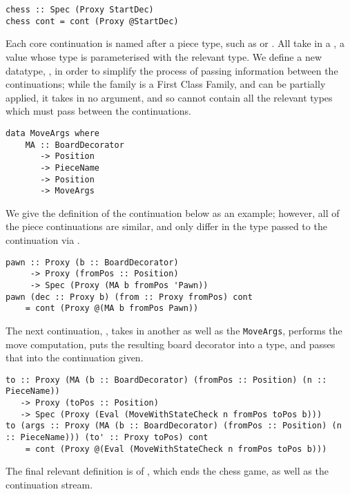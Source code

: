 \begin{lstlisting}
chess :: Spec (Proxy StartDec)
chess cont = cont (Proxy @StartDec)
\end{lstlisting}

Each core continuation is named after a piece type, such as  or . All take in a , a  value whose type is parameterised with the relevant  type. We define a new datatype, , in order to simplify the process of passing information between the continuations; while the  family is a First Class Family, and can be partially applied, it takes in no  argument, and so cannot contain all the relevant types which must pass between the continuations.

\begin{lstlisting}
data MoveArgs where
    MA :: BoardDecorator
       -> Position
       -> PieceName
       -> Position
       -> MoveArgs
\end{lstlisting}

We give the definition of the  continuation below as an example; however, all of the piece continuations are similar, and only differ in the  type passed to the continuation via .

\begin{lstlisting}
pawn :: Proxy (b :: BoardDecorator)
     -> Proxy (fromPos :: Position)
     -> Spec (Proxy (MA b fromPos 'Pawn))
pawn (dec :: Proxy b) (from :: Proxy fromPos) cont
    = cont (Proxy @(MA b fromPos Pawn))
\end{lstlisting}

The next continuation, , takes in another  as well as the \lstinline{MoveArgs}, performs the move computation, puts the resulting board decorator into a  type, and passes that  into the continuation given.

\begin{lstlisting}
to :: Proxy (MA (b :: BoardDecorator) (fromPos :: Position) (n :: PieceName))
   -> Proxy (toPos :: Position)
   -> Spec (Proxy (Eval (MoveWithStateCheck n fromPos toPos b)))
to (args :: Proxy (MA (b :: BoardDecorator) (fromPos :: Position) (n :: PieceName))) (to' :: Proxy toPos) cont
    = cont (Proxy @(Eval (MoveWithStateCheck n fromPos toPos b)))
\end{lstlisting}

The final relevant definition is of , which ends the chess game, as well as the continuation stream.

